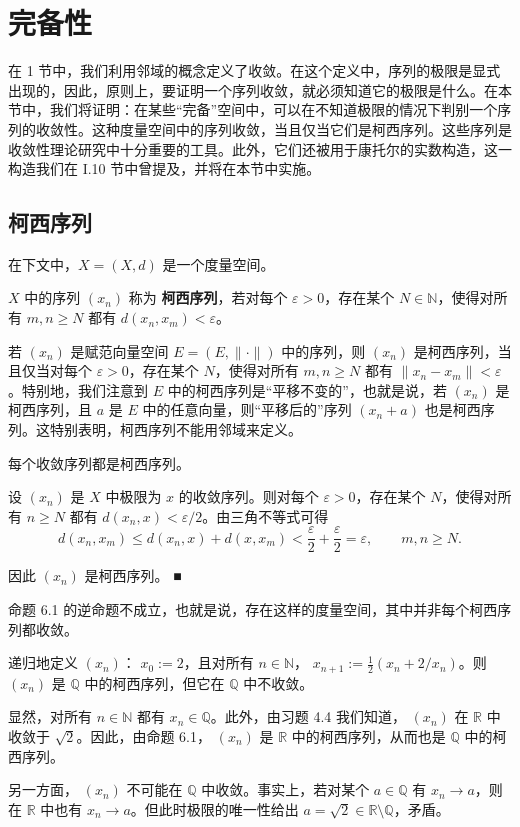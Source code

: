 \section{完备性}

在 1 节中，我们利用邻域的概念定义了收敛。在这个定义中，序列的极限是显式出现的，因此，原则上，要证明一个序列收敛，就必须知道它的极限是什么。在本节中，我们将证明：在某些“完备”空间中，可以在不知道极限的情况下判别一个序列的收敛性。这种度量空间中的序列收敛，当且仅当它们是柯西序列。这些序列是收敛性理论研究中十分重要的工具。此外，它们还被用于康托尔的实数构造，这一构造我们在 I.10 节中曾提及，并将在本节中实施。

\subsection*{柯西序列}

在下文中，$X = (X, d)$ 是一个度量空间。

$ X $ 中的序列  $ (x_n) $ 称为 \textbf{柯西序列}，若对每个  $ \varepsilon > 0 $，存在某个  $ N \in \mathbb{N} $，使得对所有  $ m, n \geq N $ 都有  $ d(x_n, x_m) < \varepsilon $。

若 $(x_n)$ 是赋范向量空间 $E = (E, \|\cdot\|)$ 中的序列，则 $(x_n)$ 是柯西序列，当且仅当对每个 $\varepsilon > 0$，存在某个 $N$，使得对所有 $m, n \geq N$ 都有 $\|x_n - x_m\| < \varepsilon$。特别地，我们注意到 $E$ 中的柯西序列是“平移不变的”，也就是说，若 $(x_n)$ 是柯西序列，且 $a$ 是 $E$ 中的任意向量，则“平移后的”序列 $(x_n + a)$ 也是柯西序列。这特别表明，柯西序列不能用邻域来定义。

\begin{proposition}

每个收敛序列都是柯西序列。

\proofhead
设 $(x_n)$ 是 $X$ 中极限为 $x$ 的收敛序列。则对每个 $\varepsilon > 0$，存在某个 $N$，使得对所有 $n \geq N$ 都有 $d(x_n, x) < \varepsilon/2$。由三角不等式可得
\[
d(x_{n},x_{m})\leq d(x_{n},x)+d(x,x_{m})<\frac{\varepsilon}{2}+\frac{\varepsilon}{2}=\varepsilon,\qquad m,n\geq N.
\]

因此  $ (x_{n}) $ 是柯西序列。 ■

\end{proposition}

命题 6.1 的逆命题不成立，也就是说，存在这样的度量空间，其中并非每个柯西序列都收敛。

\begin{example}

递归地定义  $ (x_n) $： $ x_0 := 2 $，且对所有  $ n \in \mathbb{N} $， $ x_{n+1} := \frac{1}{2}(x_n + 2/x_n) $。则  $ (x_n) $ 是  $ \mathbb{Q} $ 中的柯西序列，但它在  $ \mathbb{Q} $ 中不收敛。

\proofhead
显然，对所有  $ n \in \mathbb{N} $ 都有  $ x_n \in \mathbb{Q} $。此外，由习题 4.4 我们知道， $ (x_n) $ 在  $ \mathbb{R} $ 中收敛于  $ \sqrt{2} $。因此，由命题 6.1， $ (x_n) $ 是  $ \mathbb{R} $ 中的柯西序列，从而也是  $ \mathbb{Q} $ 中的柯西序列。

另一方面， $ (x_n) $ 不可能在  $ \mathbb{Q} $ 中收敛。事实上，若对某个  $ a \in \mathbb{Q} $ 有  $ x_n \to a $，则在  $ \mathbb{R} $ 中也有  $ x_n \to a $。但此时极限的唯一性给出  $ a = \sqrt{2} \in \mathbb{R} \setminus \mathbb{Q} $，矛盾。
\end{example}

